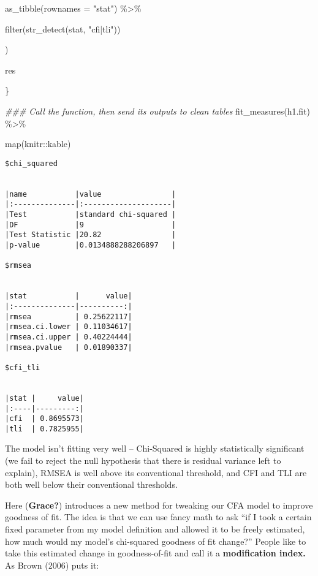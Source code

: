 \documentclass[
  letterpaper,
  DIV=11,
  numbers=noendperiod]{scrreprt}
\newenvironment{Shaded}{\begin{snugshade}}{\end{snugshade}}
\newcommand{\AttributeTok}[1]{\textcolor[rgb]{0.40,0.45,0.13}{#1}}
\newcommand{\DocumentationTok}[1]{\textcolor[rgb]{0.37,0.37,0.37}{\textit{#1}}}
\newcommand{\FunctionTok}[1]{\textcolor[rgb]{0.28,0.35,0.67}{#1}}
\newcommand{\NormalTok}[1]{\textcolor[rgb]{0.00,0.23,0.31}{#1}}
\newcommand{\SpecialCharTok}[1]{\textcolor[rgb]{0.37,0.37,0.37}{#1}}
\newcommand{\StringTok}[1]{\textcolor[rgb]{0.13,0.47,0.30}{#1}}
\begin{document}
\begin{Shaded}
\begin{Highlighting}[]
      \FunctionTok{as\_tibble}\NormalTok{(}\AttributeTok{rownames =} \StringTok{"stat"}\NormalTok{) }\SpecialCharTok{\%\textgreater{}\%} 
      
      \FunctionTok{filter}\NormalTok{(}\FunctionTok{str\_detect}\NormalTok{(stat, }\StringTok{"cfi|tli"}\NormalTok{)) }
    
\NormalTok{  )}
  
\NormalTok{  res}
  
\NormalTok{\}}

\DocumentationTok{\#\#\# Call the function, then send its outputs to clean tables}
\FunctionTok{fit\_measures}\NormalTok{(h1.fit) }\SpecialCharTok{\%\textgreater{}\%} 
  
  \FunctionTok{map}\NormalTok{(knitr}\SpecialCharTok{::}\NormalTok{kable)}
\end{Highlighting}
\end{Shaded}

\begin{verbatim}
$chi_squared


|name           |value                |
|:--------------|:--------------------|
|Test           |standard chi-squared |
|DF             |9                    |
|Test Statistic |20.82                |
|p-value        |0.0134888288206897   |

$rmsea


|stat           |      value|
|:--------------|----------:|
|rmsea          | 0.25622117|
|rmsea.ci.lower | 0.11034617|
|rmsea.ci.upper | 0.40224444|
|rmsea.pvalue   | 0.01890337|

$cfi_tli


|stat |     value|
|:----|---------:|
|cfi  | 0.8695573|
|tli  | 0.7825955|
\end{verbatim}

The model isn't fitting very well -- Chi-Squared is highly statistically
significant (we fail to reject the null hypothesis that there is
residual variance left to explain), RMSEA is well above its conventional
threshold, and CFI and TLI are both well below their conventional
thresholds.

Here (\textbf{Grace?}) introduces a new method for tweaking our CFA
model to improve goodness of fit. The idea is that we can use fancy math
to ask ``if I took a certain fixed parameter from my model definition
and allowed it to be freely estimated, how much would my model's
chi-squared goodness of fit change?'' People like to take this estimated
change in goodness-of-fit and call it a \textbf{modification index.} As
Brown (2006) puts it:
\end{document}
